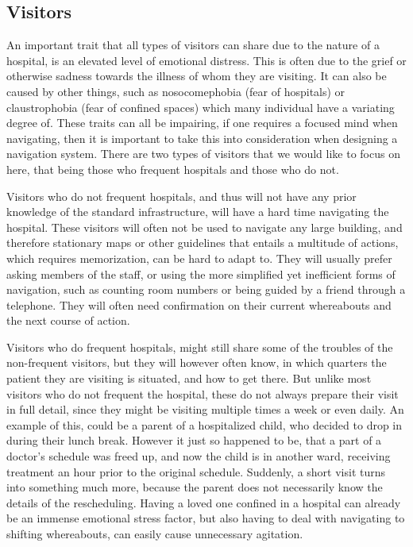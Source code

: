 \subsection{Visitors} %
 \label{par:vistors}
 
An important trait that all types of visitors can share due to the nature of a hospital, is an elevated level of emotional distress. This is often due to the grief or otherwise sadness towards the illness of whom they are visiting. It can also be caused by other things, such as nosocomephobia (fear of hospitals) or claustrophobia (fear of confined spaces) which many individual have a variating degree of\cite{individforskellige}. These traits can all be impairing, if one requires a focused mind when navigating, then it is important to take this into consideration when designing a navigation system. There are two types of visitors that we would like to focus on here, that being those who frequent hospitals and those who do not.

Visitors who do not frequent hospitals, and thus will not have any prior knowledge of the standard infrastructure, will have a hard time navigating the hospital. These visitors will often not be used to navigate any large building, and therefore stationary maps or other guidelines that entails a multitude of actions, which requires memorization, can be hard to adapt to. They will usually prefer asking members of the staff, or using the more simplified yet inefficient forms of navigation, such as counting room numbers or being guided by a friend through a telephone. They will often need confirmation on their current whereabouts and the next course of action\cite{naturtalenter,individforskelle}.

Visitors who do frequent hospitals, might still share some of the troubles of the non-frequent visitors, but they will however often know, in which quarters the patient they are visiting is situated, and how to get there. But unlike most visitors who do not frequent the hospital, these do not always prepare their visit in full detail, since they might be visiting multiple times a week or even daily. An example of this, could be a parent of a hospitalized child, who decided to drop in during their lunch break. However it just so happened to be, that a part of a doctor's schedule was freed up, and now the child is in another ward, receiving treatment an hour prior to the original schedule. Suddenly, a short visit turns into something much more, because the parent does not necessarily know the details of the rescheduling. Having a loved one confined in a hospital can already be an immense emotional stress factor, but also having to deal with navigating to shifting whereabouts, can easily cause unnecessary agitation.

